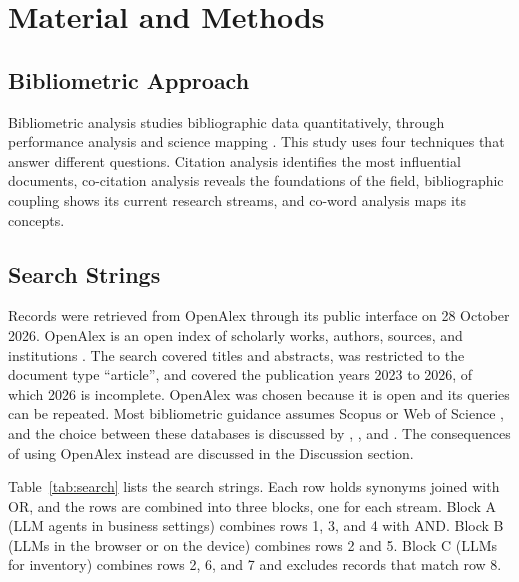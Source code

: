 \section{Material and Methods}

\subsection{Bibliometric Approach}
Bibliometric analysis studies bibliographic data quantitatively, through performance analysis and science mapping \parencite{donthu2021,zupic2015}. This study uses four techniques that answer different questions. Citation analysis identifies the most influential documents, co-citation analysis reveals the foundations of the field, bibliographic coupling shows its current research streams, and co-word analysis maps its concepts.

\subsection{Search Strings}
Records were retrieved from OpenAlex through its public interface on 28 October 2026. OpenAlex is an open index of scholarly works, authors, sources, and institutions \parencite{priem2022}. The search covered titles and abstracts, was restricted to the document type ``article'', and covered the publication years 2023 to 2026, of which 2026 is incomplete. OpenAlex was chosen because it is open and its queries can be repeated. Most bibliometric guidance assumes Scopus or Web of Science \parencite{donthu2021}, and the choice between these databases is discussed by \textcite{zhu2020}, \textcite{mongeon2016}, and \textcite{echchakoui2020}. The consequences of using OpenAlex instead are discussed in the Discussion section.

Table~\ref{tab:search} lists the search strings. Each row holds synonyms joined with OR, and the rows are combined into three blocks, one for each stream. Block A (LLM agents in business settings) combines rows 1, 3, and 4 with AND. Block B (LLMs in the browser or on the device) combines rows 2 and 5. Block C (LLMs for inventory) combines rows 2, 6, and 7 and excludes records that match row 8.

